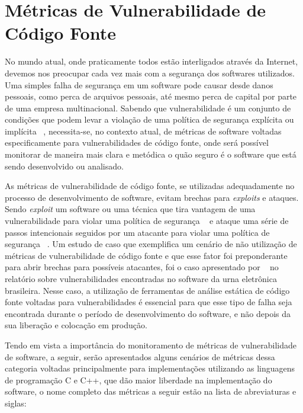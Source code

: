 \section{Métricas de Vulnerabilidade de Código Fonte} \label{cap:metricas_vuln}

No mundo atual, onde praticamente todos estão interligados através da Internet, devemos nos preocupar cada vez mais com a 
segurança dos softwares utilizados. Uma simples falha de segurança em um software pode causar desde danos pessoais, como perca 
de arquivos pessoais, até mesmo perca de capital por parte de uma empresa multinacional. Sabendo que vulnerabilidade é um 
conjunto de condições que podem levar a violação de uma política de segurança explícita ou implícita 
~\cite{seacord&householder2005}, necessita-se, no contexto atual, de métricas de software voltadas especificamente para 
vulnerabilidades de código fonte, onde será possível monitorar de maneira mais clara e metódica o quão seguro é o software que 
está sendo desenvolvido ou analisado.

As métricas de vulnerabilidade de código fonte, se utilizadas adequadamente no processo de desenvolvimento de software, evitam
brechas para \textit{exploits} e ataques. Sendo \textit{exploit} um software ou uma técnica que tira vantagem de uma 
vulnerabilidade para violar uma política de segurança ~\cite{seacord&householder2005} e ataque uma série de passos intencionais 
seguidos por um atacante para violar uma política de segurança ~\cite{howard&longstaff98}. Um estudo de caso que exemplifica 
um cenário de não utilização de métricas de vulnerabilidade de código fonte e que esse fator foi preponderante para abrir
brechas para possíveis atacantes, foi o caso apresentado por ~\cite{aranha2012} no relatório sobre vulnerabilidades 
encontradas no software da urna eletrônica brasileira. Nesse caso, a utilização de ferramentas de análise estática de código
fonte voltadas para vulnerabilidades é essencial para que esse tipo de falha seja encontrada durante o período de 
desenvolvimento do software, e não depois da sua liberação e colocação em produção.

Tendo em vista a importância do monitoramento de métricas de vulnerabilidade de software, a seguir, serão apresentados alguns
cenários de métricas dessa categoria voltadas principalmente para implementações utilizando as linguagens de programação C e 
C++, que dão maior liberdade na implementação do software, o nome completo das métricas a seguir estão na lista de abreviaturas 
e siglas:

